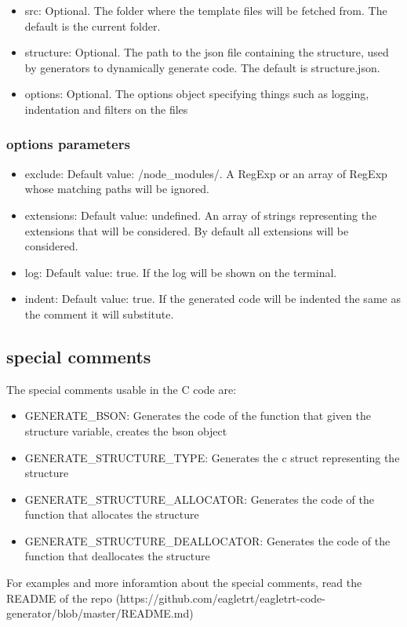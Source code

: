 \begin{itemize}
    \item src: Optional. The folder where the template files will be fetched from. The default is the current folder.
    \item structure: Optional. The path to the json file containing the structure, used by generators to dynamically generate code. The default is structure.json.
    \item options: Optional. The options object specifying things such as logging, indentation and filters on the files
\end{itemize}

\subsubsection{options parameters}

\begin{itemize}
    \item exclude: Default value: /node\_modules/. A RegExp or an array of RegExp whose matching paths will be ignored.
    \item extensions: Default value: undefined. An array of strings representing the extensions that will be considered. By default all extensions will be considered.
    \item log: Default value: true. If the log will be shown on the terminal.
    \item indent: Default value: true. If the generated code will be indented the same as the comment it will substitute.
\end{itemize}

\subsection{special comments}

The special comments usable in the C code are:

\begin{itemize}
    \item {{GENERATE\_BSON}}: Generates the code of the function that given the structure variable, creates the bson object
    \item {{GENERATE\_STRUCTURE\_TYPE}}: Generates the c struct representing the structure
    \item {{GENERATE\_STRUCTURE\_ALLOCATOR}}: Generates the code of the function that allocates the structure
    \item {{GENERATE\_STRUCTURE\_DEALLOCATOR}}: Generates the code of the function that deallocates the structure
\end{itemize}

For examples and more inforamtion about the special comments, read the README of the repo (https://github.com/eagletrt/eagletrt-code-generator/blob/master/README.md)